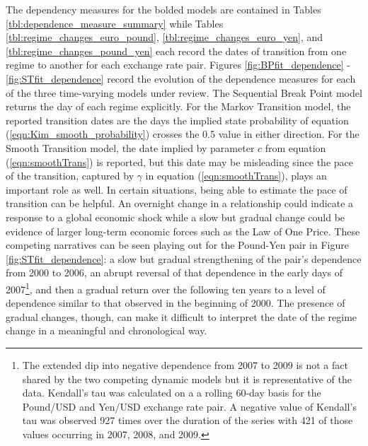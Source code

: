 \documentclass[12pt]{article}
\begin{document}
The dependency measures for the bolded models are contained in Tables \ref{tbl:dependence_measure_summary} while Tables \ref{tbl:regime_changes_euro_pound}, \ref{tbl:regime_changes_euro_yen}, and \ref{tbl:regime_changes_pound_yen} each record the dates of transition from one regime to another for each exchange rate pair. Figures \ref{fig:BPfit_dependence} - \ref{fig:STfit_dependence} record the evolution of the dependence measures for each of the three time-varying models under review. The Sequential Break Point model returns the day of each regime explicitly. For the Markov Transition model, the reported transition dates are the days the implied state probability of equation (\ref{eqn:Kim_smooth_probability}) crosses the 0.5 value in either direction. For the Smooth Transition model, the date implied by parameter $c$ from equation (\ref{eqn:smoothTrans}) is reported, but this date may be misleading since the pace of the transition, captured by $\gamma$ in equation (\ref{eqn:smoothTrans}), plays an important role as well. In certain situations, being able to estimate the pace of transition can be helpful. An overnight change in a relationship could indicate a response to a global economic shock while a slow but gradual change could be evidence of larger long-term economic forces such as the Law of One Price. These competing narratives can be seen playing out for the Pound-Yen pair in Figure \ref{fig:STfit_dependence}: a slow but gradual strengthening of the pair's dependence from 2000 to 2006, an abrupt reversal of that dependence in the early days of 2007\footnote{The extended dip into negative dependence from 2007 to 2009 is not a fact shared by the two competing dynamic models but it is representative of the data. Kendall's tau was calculated on a a rolling 60-day basis for the Pound/USD and Yen/USD exchange rate pair. A negative value of Kendall's tau was observed 927 times over the duration of the series with 421 of those values occurring in 2007, 2008, and 2009.}, and then a gradual return over the following ten years to a level of dependence similar to that observed in the beginning of 2000. The presence of gradual changes, though, can make it difficult to interpret the date of the regime change in a meaningful and chronological way. 
\end{document}
